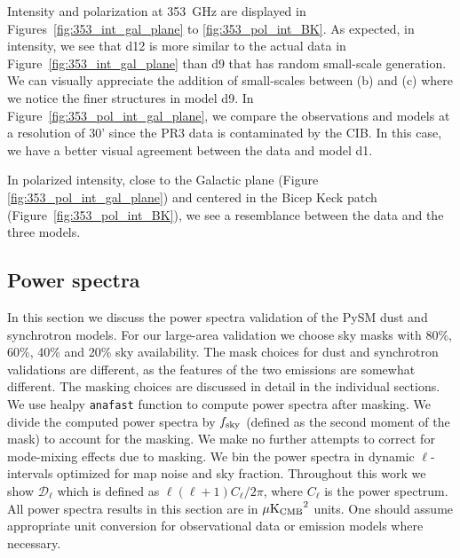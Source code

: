 \documentclass[twocolumn]{aastex631}
\begin{document}
Intensity and polarization at 353~GHz are displayed in Figures~\ref{fig:353_int_gal_plane} to \ref{fig:353_pol_int_BK}. 
As expected, in intensity, we see that d12 is more similar to the actual data in Figure~\ref{fig:353_int_gal_plane} than d9 that has random small-scale generation. We can visually appreciate the addition of small-scales between (b) and (c) where we notice the finer structures in model d9. %
In Figure~\ref{fig:353_pol_int_gal_plane}, we compare the observations and models at a resolution of 30' since the PR3 data is contaminated by the CIB. In this case, we have a better visual agreement between the data and model d1. 

In polarized intensity, close to the Galactic plane (Figure \ref{fig:353_pol_int_gal_plane}) and centered in the Bicep Keck patch (Figure~\ref{fig:353_pol_int_BK}), we see a resemblance between the data and the three models. 

\subsection{Power spectra}
\label{sec:PS-validation}
In this section we discuss the power spectra validation of the PySM dust and synchrotron models. For our large-area validation we choose sky masks with 80\%, 60\%, 40\% and 20\% sky availability. The mask choices for dust and synchrotron validations are different, as the features of the two emissions are somewhat different. The masking choices are discussed in detail in the individual sections. We use healpy \texttt{anafast} function to compute power spectra after masking. We divide the computed power spectra by $f_{\rm sky}$ (defined as the second moment of the mask) to account for the masking. We make no further attempts to correct for mode-mixing effects due to masking. We bin the power spectra in dynamic $\ell$-intervals optimized for map noise and sky fraction. Throughout this work we show $\mathcal{D}_\ell$ which is defined as $\ell(\ell + 1) C_\ell / 2\pi$, where $C_\ell$ is the power spectrum. All power spectra results in this section are in $\mu{\rm K_{CMB}}^2$ units. One should assume appropriate unit conversion for observational data or emission models where necessary.
\end{document}
